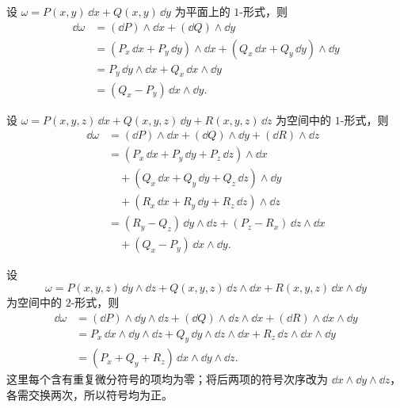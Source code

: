 \begin{example}
设 $\omega=P(x,y)\,\dd x+Q(x,y)\,\dd y$ 为平面上的 $1$-形式，则
\begin{align*}
\dd\omega
&=(\dd P)\wedge\dd x+(\dd Q)\wedge\dd y\\
&=(P_x\,\dd x+P_y\,\dd y)\wedge\dd x
 +(Q_x\,\dd x+Q_y\,\dd y)\wedge\dd y\\
&=P_y\,\dd y\wedge\dd x+Q_x\,\dd x\wedge\dd y\\
&=(Q_x-P_y)\,\dd x\wedge\dd y.
\end{align*}
\end{example}

\begin{example}
设 $\omega=P(x,y,z)\,\dd x+Q(x,y,z)\,\dd y+R(x,y,z)\,\dd z$ 为空间中的 $1$-形式，则
\begin{align*}
\dd\omega
&=(\dd P)\wedge\dd x+(\dd Q)\wedge\dd y+(\dd R)\wedge\dd z\\
&=(P_x\,\dd x+P_y\,\dd y+P_z\,\dd z)\wedge\dd x\\
&\quad+(Q_x\,\dd x+Q_y\,\dd y+Q_z\,\dd z)\wedge\dd y\\
&\quad+(R_x\,\dd x+R_y\,\dd y+R_z\,\dd z)\wedge\dd z\\
&=(R_y-Q_z)\,\dd y\wedge\dd z
 +(P_z-R_x)\,\dd z\wedge\dd x\\
&\quad+(Q_x-P_y)\,\dd x\wedge\dd y.
\end{align*}
\end{example}

\begin{example}
设
\[
\omega=P(x,y,z)\,\dd y\wedge\dd z
+Q(x,y,z)\,\dd z\wedge\dd x
+R(x,y,z)\,\dd x\wedge\dd y
\]
为空间中的 $2$-形式，则
\begin{align*}
\dd\omega
&=(\dd P)\wedge\dd y\wedge\dd z
 +(\dd Q)\wedge\dd z\wedge\dd x
 +(\dd R)\wedge\dd x\wedge\dd y\\
&=P_x\,\dd x\wedge\dd y\wedge\dd z
 +Q_y\,\dd y\wedge\dd z\wedge\dd x
 +R_z\,\dd z\wedge\dd x\wedge\dd y\\
&=(P_x+Q_y+R_z)\,\dd x\wedge\dd y\wedge\dd z.
\end{align*}
这里每个含有重复微分符号的项均为零；将后两项的符号次序改为 $\dd x\wedge\dd y\wedge\dd z$，各需交换两次，所以符号均为正。
\end{example}

